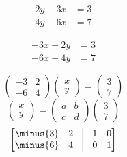 \documentclass[crop=false,class=book,oneside]{standalone}                      %
\begin{document}
        \begin{align*}
            2y-3x&=3\\
            4y-6x&=7
        \end{align*}
        \par\hfill\par
        \begin{align*}
            \minus{3}x+2y&=3\\
            \minus{6}x+4y&=7
        \end{align*}
        \par\hfill\par
        \begin{equation}
            \begin{pmatrix}
                \minus{3}&2\\
                \minus{6}&4
            \end{pmatrix}
            \begin{pmatrix}
                x\\y
            \end{pmatrix}
            =
            \begin{pmatrix}
                3\\7
            \end{pmatrix}
        \end{equation}
        \begin{equation}
            \begin{pmatrix}
                x\\y
            \end{pmatrix}
            =
            \begin{pmatrix}
                a&b\\
                c&d
            \end{pmatrix}
            \begin{pmatrix}
                3\\7
            \end{pmatrix}
        \end{equation}
        \begin{equation}
            \begin{bmatrix}
                \minus{3}&2&\vline&1&0\\
                \minus{6}&4&\vline&0&1
            \end{bmatrix}
        \end{equation}
\end{document}
